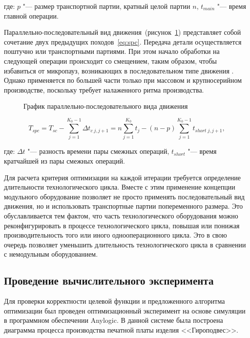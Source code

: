 \noindent где: $p$ "--- размер транспортной партии, кратный целой партии $n$, $t_{main}$ "--- время главной операции.

Параллельно-последовательный вид движения~(рисунок~\cref{fig:seq-parallel}) представляет собой сочетание двух предыдущих походов~\cref{eq:spc}. Передача детали осуществляется поштучно или транспортными партиями. При этом начало обработки на следующей операции происходит со смещением, таким образом, чтобы избавиться от микропауз, возникающих в последовательном типе движения . Однако применяется по большей части только при массовом и крупносерийном производстве, поскольку требует налаженного ритма производства.

\begin{figure}[!htb]
	\caption{График параллельно-последовательного вида движения}\label{fig:seq-parallel}
\end{figure}

\begin{equation}
T_{spc} = T_{sc} - \sum_{j=1}^{K_{0}-1}\Delta t_{c \;  j,j+1} = n \sum_{j=1}^{K_0}t_j-(n-p)\sum_{j=1}^{K_{0}-1}t_{short \; j,j+1},
\label{eq:spc}
\end{equation}

\noindent где: $\Delta t$ "--- разность времени пары смежных операций, $t_{short}$ "--- время кратчайшей из пары смежных операций. 

Для расчета критерия оптимизации на каждой итерации требуется определение длительности технологического цикла. Вместе с этим применение концепции модульного оборудование позволяет не просто применять последовательный вид движения, но и использовать транспортные партии попеременного размера. Это обуславливается тем фактом, что часть технологического оборудования можно реконфигурировать в процессе технологического цикла, повышая или понижая производительность того или иного однооперационного цикла.  Это в свою очередь позволяет уменьшить длительность технологического цикла в сравнении с немодульным оборудованием.

\subsection{Проведение вычислительного эксперимента}

Для проверки корректности целевой функции и предложенного алгоритма оптимизации был проведен оптимизационный эксперимент на основе симуляции в программном обеспечении Anylogic. В данной системе была построена диаграмма процесса производства печатной платы изделия <<Гироподвес>>.

